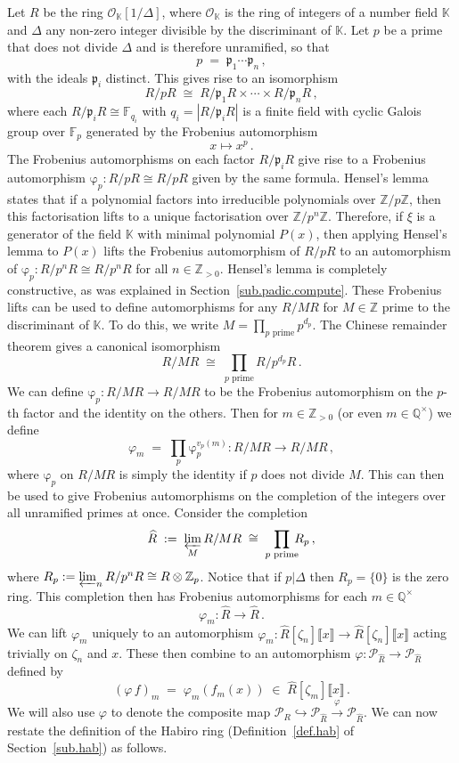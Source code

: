 \documentclass[12pt,reqno]{amsart}
\theoremstyle{definition}
\def\BZ{\mathbb Z}
\def\BQ{\mathbb Q}
\def\BF{\mathbb F}
\def\BK{\mathbb K}
\def\calP{\mathcal P}
\def\be{\begin{equation}}
\def\ee{\end{equation}}
\def\z{\zeta}
\def\calO{\mathcal{O}}
\def\={\;=\;}
\def\inn{\;\in\;}
\def\fr{\mathrm{\varphi}_p}
\begin{document}
Let $R$ be the ring $\calO_{\BK}[1/\Delta]$, where $\calO_{\BK}$ is the ring of
integers of a number field $\BK$ and
$\Delta$ any non-zero integer divisible by the discriminant of $\BK$.
Let $p$ be a prime that does not divide $\Delta$ and is therefore unramified, so
that
\be
p \= \mathfrak{p}_{1}\cdots\mathfrak{p}_{n}\,,
\ee
with the ideals $\mathfrak{p}_{i}$ distinct. This gives rise to an isomorphism
\be
R/pR \;\cong\; R/\mathfrak{p}_{1}R\times\cdots\times R/\mathfrak{p}_{n}R\,,
\ee
where each $R/\mathfrak{p}_{i}R\cong\BF_{q_i}$ with $q_i=|R/\mathfrak{p}_{i}R|$ is a
finite field with cyclic Galois group over $\BF_{p}$ generated by the
Frobenius automorphism
\be
x\mapsto x^p\,.
\ee
The Frobenius automorphisms on each factor $R/\mathfrak{p}_{i}R$ give rise to a
Frobenius
automorphism $\fr:R/pR\cong R/pR$ given by the same formula. Hensel's lemma states
that if a polynomial factors into irreducible polynomials over $\BZ/p\BZ$, then
this factorisation lifts to a unique factorisation over $\BZ/p^n\BZ$. Therefore,
if $\xi$ is a generator of the field $\BK$ with minimal polynomial $P(x)$, then
applying
Hensel's lemma to $P(x)$ lifts the Frobenius automorphism of $R/pR$ to an
automorphism of
$\fr:R/p^nR\cong R/p^nR$ for all $n\in\BZ_{>0}$. Hensel's lemma is completely
constructive, as was explained in Section~\ref{sub.padic.compute}. These Frobenius
lifts can be used to define automorphisms for any $R/MR$ for $M\in\BZ$ prime to
the discriminant of $\BK$. To do this, we write $M=\prod_{p\text{ prime}}p^{d_p}$.
The Chinese remainder theorem gives a canonical isomorphism
\be
R/MR \;\cong\; \prod_{p\text{ prime}}R/p^{d_p}R\,.
\ee
We can define $\fr:R/MR\to R/MR$ to be the Frobenius automorphism on the $p$-th
factor and the identity on the others.
Then for $m\in\BZ_{>0}$ (or even $m\in\BQ^{\times}$) we define
\be
\varphi_{m}\=\prod_{p}\fr^{v_{p}(m)}:R/MR\rightarrow R/MR\,,
\ee
where $\fr$ on $R/MR$ is simply the identity if $p$ does not divide $M$.
This can then be used to give Frobenius automorphisms on the completion of
the integers over all unramified primes at once. Consider the completion
\be
\widehat{R} \;:=\; \varprojlim_{M} R/MR \;\cong\; \prod_{p\text{ prime}}\!\!\!
R_p\,,
\ee
where $R_p:=\varprojlim_{n}R/p^nR\cong R\otimes\BZ_p$.
Notice that if $p|\Delta$ then $R_p=\{0\}$ is the zero ring. This completion then has
Frobenius automorphisms for each $m\in\BQ^{\times}$
\be
\varphi_{m}:\widehat{R}
\rightarrow
\widehat{R}\,.
\ee
We can lift $\varphi_{m}$ uniquely to an automorphism
$\varphi_{m}:\widehat{R}[\z_n]\llbracket
x\rrbracket\to\widehat{R}[\z_n]\llbracket x\rrbracket$ acting trivially on $\z_n$
and $x$. These then combine to an automorphism
$\varphi:\calP_{\widehat{R}}\to\calP_{\widehat{R}}$ defined by
\be
(\varphi\,f)_{m}
\=
\varphi_{m}(f_{m}(x))
\inn
\widehat{R}[\z_m]\llbracket x\rrbracket\,.
\ee
We will also use $\varphi$ to denote the composite map
$\calP_R\hookrightarrow\calP_{\widehat{R}}\overset{\varphi}{\rightarrow}
\calP_{\widehat{R}}$.
We can now restate the definition of the Habiro ring (Definition~\ref{def.hab}
of Section~\ref{sub.hab}) as follows.
\end{document}
